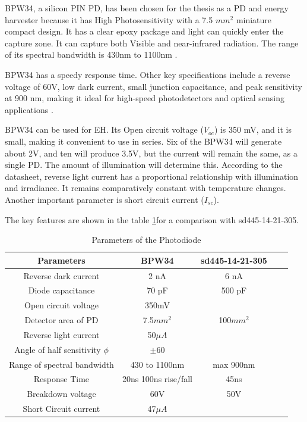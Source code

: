 BPW34, a silicon PIN \ac{PD}, has been chosen for the thesis as a \ac{PD} and energy harvester because it has High Photosensitivity with a 7.5 \(mm^{2}\) miniature compact design. It has a clear epoxy package and light can quickly enter the capture zone. It can capture both Visible and near-infrared radiation. The range of its spectral bandwidth is 430nm to 1100nm \cite{intertechnology2011bpw34}.

BPW34 has a speedy response time. Other key specifications include a reverse voltage of 60V, low dark current, small junction capacitance, and peak sensitivity at 900 nm, making it ideal for high-speed photodetectors and optical sensing applications \cite{intertechnology2011bpw34} \cite{7420990}.

BPW34 can be used for \ac{EH}. Its Open circuit voltage (\(V_{oc}\)) is 350 mV, and it is small, making it convenient to use in series. Six of the BPW34 will generate about 2V, and ten will produce 3.5V, but the current will remain the same, as a single \ac{PD}. The amount of illumination will determine this. According to the datasheet, reverse light current has a proportional relationship with illumination and irradiance. It remains comparatively constant with temperature changes. Another important parameter is short circuit current (\(I_{sc}\)). \cite{intertechnology2011bpw34}

The key features are shown in the table \ref{tab:4.2}for a comparison with sd445-14-21-305. 

\begin{table}
    \centering
    \caption{Parameters of the Photodiode}
    \begin{tabular}{|c|c|c|c|c|}
         \hline
         \textbf{Parameters} &\textbf{BPW34} &\textbf{sd445-14-21-305}  \\
         \hline
         Reverse dark current  &2 nA &6 nA \\
         \hline
         Diode capacitance  &70 pF  &500 pF\\
         \hline
         Open circuit voltage  &350mV &\\
         \hline
         Detector area of PD &7.5\(mm^2\) &100\(mm^2\) \\
         \hline
         Reverse light current  &50\(\mu A\)  & \\
         \hline
         Angle of half sensitivity \(\phi\)  & \(\pm\)60 &\\
         \hline
         Range of spectral bandwidth   &430 to 1100nm &max 900nm \\
         \hline
         Response Time &20ns 100ns rise/fall &45ns\\
         \hline
         Breakdown voltage  &60V  &50V\\
         \hline
         Short Circuit current  &47\(\mu A\)   &\\
         \hline
    \end{tabular}
    \label{tab:4.2}
\end{table}

